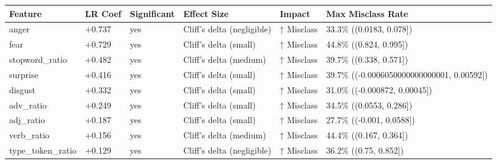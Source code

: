 \begin{tabular}{llllll}
\toprule
Feature & LR Coef & Significant & Effect Size & Impact & Max Misclass Rate \\
\midrule
anger & +0.737 & yes & Cliff's delta (negligible) & ↑ Misclass & 33.3\% ((0.0183, 0.078]) \\
fear & +0.729 & yes & Cliff's delta (small) & ↑ Misclass & 44.8\% ((0.824, 0.995]) \\
stopword\_ratio & +0.482 & yes & Cliff's delta (medium) & ↑ Misclass & 39.7\% ((0.338, 0.571]) \\
surprise & +0.416 & yes & Cliff's delta (small) & ↑ Misclass & 39.7\% ((-0.0006050000000000001, 0.00592]) \\
disgust & +0.332 & yes & Cliff's delta (small) & ↑ Misclass & 31.0\% ((-0.000872, 0.00045]) \\
adv\_ratio & +0.249 & yes & Cliff's delta (small) & ↑ Misclass & 34.5\% ((0.0553, 0.286]) \\
adj\_ratio & +0.187 & yes & Cliff's delta (small) & ↑ Misclass & 27.7\% ((-0.001, 0.0588]) \\
verb\_ratio & +0.156 & yes & Cliff's delta (medium) & ↑ Misclass & 44.4\% ((0.167, 0.364]) \\
type\_token\_ratio & +0.129 & yes & Cliff's delta (negligible) & ↑ Misclass & 36.2\% ((0.75, 0.852]) \\
\bottomrule
\end{tabular}
